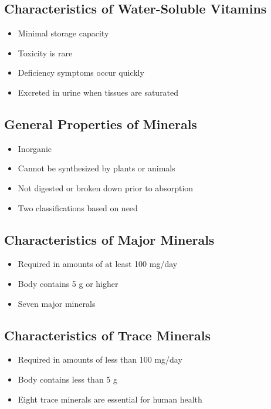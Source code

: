 \documentclass[title={Chapter 6}]{fdsn201notes}
\begin{document}
\subsection{Characteristics of Water-Soluble Vitamins}\label{subsec:characteristics-of-water-soluble-vitamins}
\begin{itemize}
	\item Minimal storage capacity
	\item Toxicity is rare
	\item Deficiency symptoms occur quickly
	\item Excreted in urine when tissues are saturated
\end{itemize}

\subsection{General Properties of Minerals}\label{subsec:general-properties-of-minerals}
\begin{itemize}
	\item Inorganic
	\item Cannot be synthesized by plants or animals
	\item Not digested or broken down prior to absorption
	\item Two classifications based on need
\end{itemize}

\subsection{Characteristics of Major Minerals}\label{subsec:characteristics-of-major-minerals}
\begin{itemize}
	\item Required in amounts of at least 100 mg/day
	\item Body contains 5 g or higher
	\item Seven major minerals
\end{itemize}

\subsection{Characteristics of Trace Minerals}\label{subsec:characteristics-of-trace-minerals}
\begin{itemize}
	\item Required in amounts of less than 100 mg/day
	\item Body contains less than 5 g
	\item Eight trace minerals are essential for human health
\end{itemize}
\end{document}
